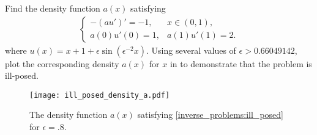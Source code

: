\begin{problem}
	Find the density function $a(x)$ satisfying 
	\begin{align}
	\begin{cases}
		-(au')' = -1, & x \in (0,1),\\
		a(0)u'(0) = 1, & a(1)u'(1) = 2.
	\end{cases} \label{inverse_problems:ill_posed}
	\end{align}
	where $u(x) = x + 1 + \epsilon \sin(\epsilon^{-2}x)$. 
Using several values of $\epsilon  > 0.66049142$, plot the corresponding density $a(x)$ for $x$ in  to demonstrate that the problem is ill-posed.
\end{problem}

\begin{figure}
\centering
\texttt{[image: ill\_posed\_density\_a.pdf]}
\caption{The density function $a(x)$ satisfying \eqref{inverse_problems:ill_posed} for $\epsilon = .8$.}
\label{fig:inverse_problems:exercise1}
\end{figure}